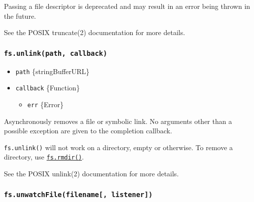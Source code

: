 Passing a file descriptor is deprecated and may result in an error being
thrown in the future.

See the POSIX truncate(2) documentation for more details.

\subsubsection{\texorpdfstring{\texttt{fs.unlink(path,\ callback)}}{fs.unlink(path, callback)}}\label{fs.unlinkpath-callback}

\begin{itemize}
\tightlist
\item
  \texttt{path} \{string\textbar Buffer\textbar URL\}
\item
  \texttt{callback} \{Function\}

  \begin{itemize}
  \tightlist
  \item
    \texttt{err} \{Error\}
  \end{itemize}
\end{itemize}

Asynchronously removes a file or symbolic link. No arguments other than
a possible exception are given to the completion callback.

\begin{Shaded}
\begin{Highlighting}[]
 \OperatorTok{;}
\NormalTok{(}\OperatorTok{,}\KeywordTok{=\textgreater{}}\NormalTok{ \{}
  \OperatorTok{;}
  \NormalTok{(}\NormalTok{)}\OperatorTok{;}
\NormalTok{\})}\OperatorTok{;}
\end{Highlighting}
\end{Shaded}

\texttt{fs.unlink()} will not work on a directory, empty or otherwise.
To remove a directory, use
\hyperref[fsrmdirpath-options-callback]{\texttt{fs.rmdir()}}.

See the POSIX unlink(2) documentation for more details.

\subsubsection{\texorpdfstring{\texttt{fs.unwatchFile(filename{[},\ listener{]})}}{fs.unwatchFile(filename{[}, listener{]})}}\label{fs.unwatchfilefilename-listener}

